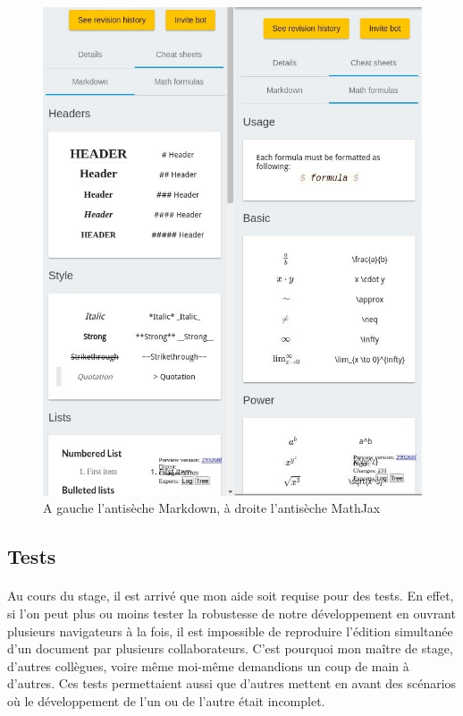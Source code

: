 \documentclass[12pt]{article}
\begin{document}
\begin{figure}[H]
    \centering
    \includegraphics[scale=0.7]{gallery/cheat-sheets.jpg}
    \caption[nom dans le sommaire]{A gauche l'antisèche Markdown, à droite l'antisèche MathJax}
    \label{fig:gallery5}
\end{figure}


\newpage
\subsection{Tests}
\paragraph{}
Au cours du stage, il est arrivé que mon aide soit requise pour des tests. En effet, si l'on peut plus ou moins tester la robustesse de notre développement en ouvrant plusieurs navigateurs à la fois, il est impossible de reproduire l'édition simultanée d'un document par plusieurs collaborateurs. C'est pourquoi mon maître de stage, d'autres collègues, voire même moi-même demandions un coup de main à d'autres. Ces tests permettaient aussi que d'autres mettent en avant des scénarios où le développement de l'un ou de l'autre était incomplet.
\end{document}
